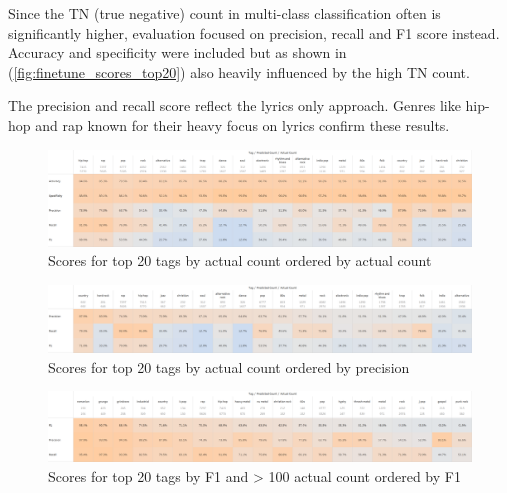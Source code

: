 \documentclass[a4paper,12pt]{scrartcl}
\begin{document}
\begin{multicols}{2}
Since the TN (true negative) count in multi-class classification often is significantly higher, evaluation focused on precision, recall and F1 score instead. Accuracy and specificity were included but as shown in (\autoref{fig:finetune_scores_top20}) also heavily influenced by the high TN count.

The precision and recall score reflect the lyrics only approach. Genres like hip-hop and rap known for their heavy focus on lyrics confirm these results.

\end{multicols}

\begin{figure}[h]
    \includegraphics[width=\textwidth]{media/Scores.png}   
    \caption{Scores for top 20 tags by actual count ordered by actual count}
    \label{fig:finetune_scores_top20}
\end{figure}

\begin{multicols}{2}
\end{multicols}



\begin{figure}[h]
    \includegraphics[width=\textwidth]{media/Scores By Precision.png}   
    \caption{Scores for top 20 tags by actual count ordered by precision}
    \label{fig:finetune_scores_top20_precision}
\end{figure}

\begin{figure}[h]
    \includegraphics[width=\textwidth]{media/Scores By F1.png}   
    \caption{Scores for top 20 tags by F1 and > 100 actual count ordered by F1}
    \label{fig:finetune_scores_top20_f1}
\end{figure}
\end{document}
